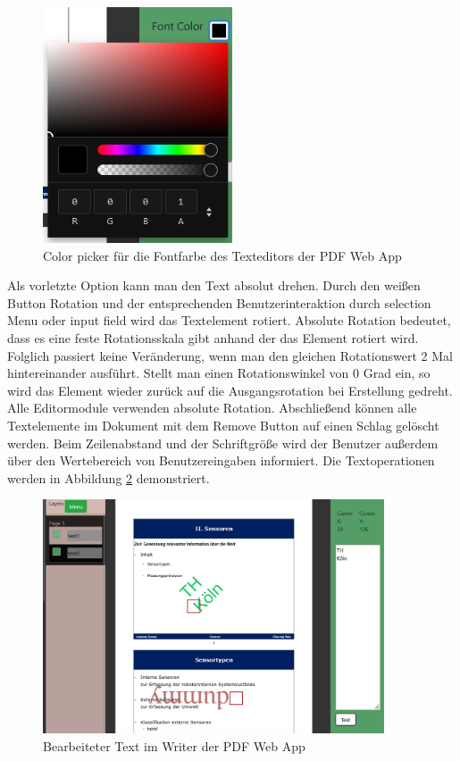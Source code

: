 \begin{figure}[!htbp]
	\centering
	\includegraphics[width=0.5\textwidth]{"images/fontcolor.png"}
	\caption{Color picker für die Fontfarbe des Texteditors der PDF Web App}
	\label{fig:fontcolor}
\end{figure}

Als vorletzte Option kann man den Text absolut drehen. Durch den weißen Button Rotation und der entsprechenden Benutzerinteraktion durch selection Menu oder input field wird das Textelement rotiert. Absolute Rotation bedeutet, dass es eine feste Rotationsskala gibt anhand der das Element rotiert wird. Folglich passiert keine Veränderung, wenn man den gleichen Rotationswert 2 Mal hintereinander ausführt. Stellt man einen Rotationswinkel von 0 Grad ein, so wird das Element wieder zurück auf die Ausgangsrotation bei Erstellung gedreht. Alle Editormodule verwenden absolute Rotation. Abschließend können alle Textelemente im Dokument mit dem Remove Button auf einen Schlag gelöscht werden. Beim Zeilenabstand und der Schriftgröße wird der Benutzer außerdem über den Wertebereich von Benutzereingaben informiert. Die Textoperationen werden in Abbildung \ref{fig:text} demonstriert.

\begin{figure}[!htbp]
	\centering
	\includegraphics[width=0.9\textwidth]{"images/text.png"}
	\caption{Bearbeiteter Text im Writer der PDF Web App}
	\label{fig:text}
\end{figure}

